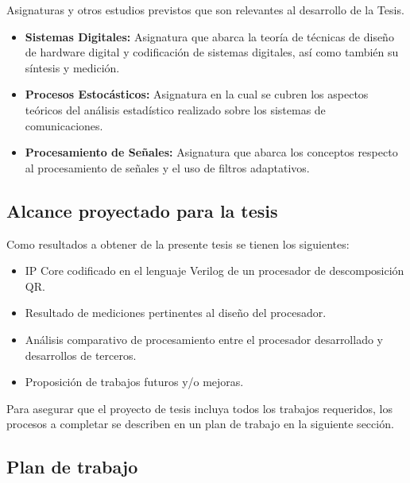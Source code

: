 \documentclass[a4paper]{article}
\begin{document}
Asignaturas y otros estudios previstos que son relevantes al desarrollo de la Tesis.

\begin{itemize}
   \item \textbf{Sistemas Digitales:} Asignatura que abarca la teoría de técnicas de diseño de hardware digital y codificación de sistemas digitales, así como también su síntesis y medición.
   \item \textbf{Procesos Estocásticos:} Asignatura en la cual se cubren los aspectos teóricos del análisis estadístico realizado sobre los sistemas de comunicaciones.
   \item \textbf{Procesamiento de Señales:} Asignatura que abarca los conceptos respecto al procesamiento de señales y el uso de filtros adaptativos.
\end{itemize}

\subsection{Alcance proyectado para la tesis}

Como resultados a obtener de la presente tesis se tienen los siguientes:

\begin{itemize}
    \item IP Core codificado en el lenguaje Verilog de un procesador de descomposición QR.
    \item Resultado de mediciones pertinentes al diseño del procesador.
    \item Análisis comparativo de procesamiento entre el procesador desarrollado y desarrollos de terceros.
    \item Proposición de trabajos futuros y/o mejoras.
\end{itemize}

Para asegurar que el proyecto de tesis incluya todos los trabajos requeridos, los procesos a completar se describen en un plan de trabajo en la siguiente sección.

\newpage

\subsection{Plan de trabajo}

\end{document}
